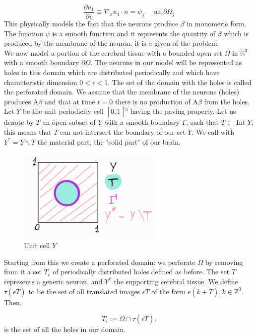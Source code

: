 $$ 
\frac{\partial u_{1}}{\partial v} \equiv \nabla_{x} u_1 \cdot n= \psi_{j} \quad \text { on } \partial\Omega_{j}
$$
This physically models the fact that the neurons produce \(\beta\) in monomeric form. The function $\psi$ is a smooth function and it represents the quantity of \(\beta\) which is produced by the membrane of the neuron, it is a given of the problem.\\
We now model a portion of the cerebral tissue with a bounded open set $\Omega$ in $\mathbb{R}^{3}$ with a smooth boundary $\partial \Omega$. The neurons in our model will be represented as holes in this domain which are distributed periodically and which have characteristic dimension $0<\epsilon<1$. The set of the domain with the holes is called the perforated domain.
We assume that the membrane of the neurons (holes) produces $\mathrm{A} \beta$ and that at time $t=0$ there is no production of  $\mathrm{A} \beta$ from the holes. \\
Let $Y$ be the unit periodicity cell $\left[0,1\left[{ }^{3}\right.\right.$ having the paving property. 
Let us denote by $T$ an open subset of $Y$ with a smooth boundary $\Gamma$, such that $\bar{T} \subset \operatorname{Int} Y$, this means that $T$ can not intersect the boundary of our set $Y$. We call with $Y^{*}=Y \backslash T$ the material part, the "solid part" of our brain.
\begin{figure}[H]
   \centering
   \includegraphics[width=7cm]{unitcellMS.jpg}
   \caption{Unit cell $Y$}
    \label{fig:Y}
\end{figure}

Starting from this we create a perforated domain: we perforate $\Omega$ by removing from it a set $T_{\epsilon}$ of periodically distributed holes defined as before. The set $T$ represents a generic neuron, and $Y^{*}$ the supporting cerebral tissue. We define $\tau(\epsilon \bar{T})$ to be the set of all translated images $\epsilon \bar{T}$ of the form $\epsilon(k+\bar{T}), k \in \mathbb{Z}^{3}$. Then,

\[ T_{\epsilon}:=\Omega \cap \tau(\epsilon \bar{T}) . \] is the set of all the holes in our domain.

